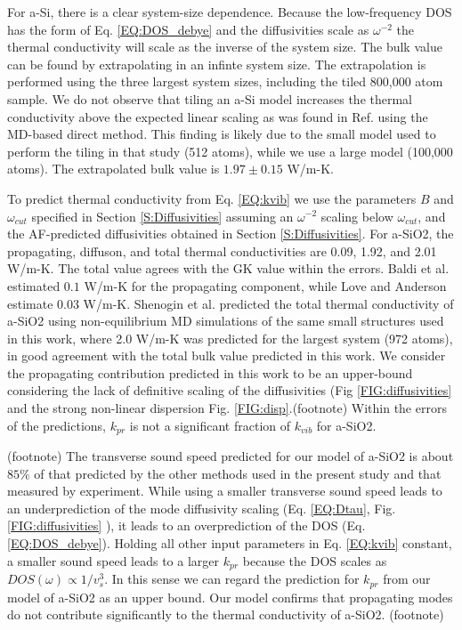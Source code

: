 \documentclass[aps,prb,onecolumn,preprint,superscriptaddress,footinbib,amsmath,amssymb,floatfix]{revtex4}
\begin{document}
For a-Si, there is a clear system-size dependence. 
Because the low-frequency DOS has the form of Eq. \eqref{EQ:DOS_debye} 
and the diffusivities scale as $\omega^{-2}$ 
the thermal conductivity will scale as the inverse of the system size. 
The bulk value can be found by extrapolating in an infinte system size.
\cite{shiomi_thermal_2011,esfarjani_heat_2011,larkin_comparison_2012} 
The extrapolation is performed using the three largest 
system sizes, including the tiled 800,000 atom sample.  
We do not observe that tiling an a-Si model increases 
the thermal conductivity above the expected linear scaling as 
was found in Ref.  using the MD-based 
direct method. This finding is likely due to the 
small model used to perform the tiling in that study (512 atoms),  
while we use a large model (100,000 atoms). 
The extrapolated bulk value is $1.97 \pm 0.15$ W/m-K.

To predict thermal conductivity from Eq. \eqref{EQ:kvib} 
we use the parameters $B$ and $\omega_{cut}$ specified 
in Section \ref{S:Diffusivities} assuming an $\omega^{-2}$ 
scaling below $\omega_{cut}$, and the AF-predicted diffusivities 
obtained in Section \ref{S:Diffusivities}. 
For a-SiO2, the propagating, diffuson, and total thermal 
conductivities are 0.09, 1.92, and 2.01 W/m-K. The total 
value agrees with the GK value within the errors. 
Baldi et al. estimated $0.1$ W/m-K for the propagating component,
\cite{baldi_thermal_2008} while Love and Anderson estimate 0.03 
W/m-K.\cite{love_estimate_1990} 
Shenogin et al. predicted the total thermal 
conductivity of a-SiO2 using 
non-equilibrium MD simulations of the same small structures 
used in this work, where 2.0 W/m-K was predicted for the 
largest system (972 atoms), in good agreement with the total 
bulk value predicted in this work.\cite{shenogin_predicting_2009} 
We consider the propagating contribution 
predicted in this work to be an upper-bound considering 
the lack of definitive scaling of the diffusivities 
(Fig \ref{FIG:diffusivities} and the 
strong non-linear dispersion Fig. \ref{FIG:disp}.(footnote) 
Within the errors of the predictions, $k_{pr}$ is not a significant 
fraction of $k_{vib}$ for a-SiO2. 



(footnote)
The transverse sound speed predicted for our model of 
a-SiO2 is about $85\%$ of that predicted by 
the other methods used in the present study and that 
measured by experiment.\cite{liu_high_2009}  
While using a smaller transverse sound speed 
leads to an underprediction of the 
mode diffusivity scaling (Eq. \eqref{EQ:Dtau},
Fig. \ref{FIG:diffusivities} ), it leads to an 
overprediction of the DOS (Eq. \eqref{EQ:DOS_debye}). 
Holding all other input parameters in Eq. \eqref{EQ:kvib} constant, 
a smaller sound speed leads to a larger $k_{pr}$ 
because the DOS scales as 
$DOS(\omega)\propto 1/v^3_{s}$. In this sense we can regard 
the prediction for $k_{pr}$ from 
our model of a-SiO2 as an upper bound. 
Our model confirms that propagating modes do not contribute 
significantly to the thermal conductivity of a-SiO2.
(footnote)
\end{document}
